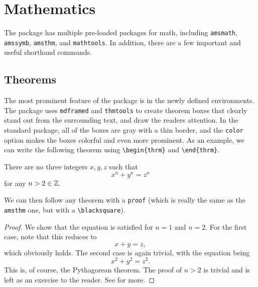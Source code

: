 \documentclass[11pt]{article}
\begin{document}
\section{Mathematics}
The package has multiple pre-loaded packages for math, including \texttt{amsmath}, \texttt{amssymb}, \texttt{amsthm}, and \texttt{mathtools}. In addition, there are a few important and useful shorthand commands.

\subsection{Theorems}
The most prominent feature of the package is in the newly defined environments. The package uses \texttt{mdframed} and \texttt{thmtools} to create theorem boxes that clearly stand out from the surrounding text, and draw the readers attention. In the standard package, all of the boxes are gray with a thin border, and the \texttt{color} option makes the boxes colorful and even more prominent. As an example, we can write the following theorem using \verb|\begin{thrm}| and \verb|\end{thrm}|.
\begin{thrm}
	There are no three integers $x,y,z$ such that
	\[x^n + y^n = z^n\]
	for any $n > 2 \in \mathbb{Z}$.
\end{thrm}
We can then follow any theorem with a \verb|proof| (which is really the same as the \texttt{amsthm} one, but with a \verb|\blacksquare|).

\begin{proof}
	We show that the equation is satisfied for $n = 1$ and $n = 2$. For the first case, note that this reduces to
	\[x + y = z,\]
	which obviously holds. The second case is again trivial, with the equation being
	\[x^2 + y^2 = z^2.\]
	This is, of course, the Pythagorean theorem. The proof of $n > 2$ is trivial and is left as an exercise to the reader. See \cite{wiles1995} for more.
\end{proof}
\end{document}
